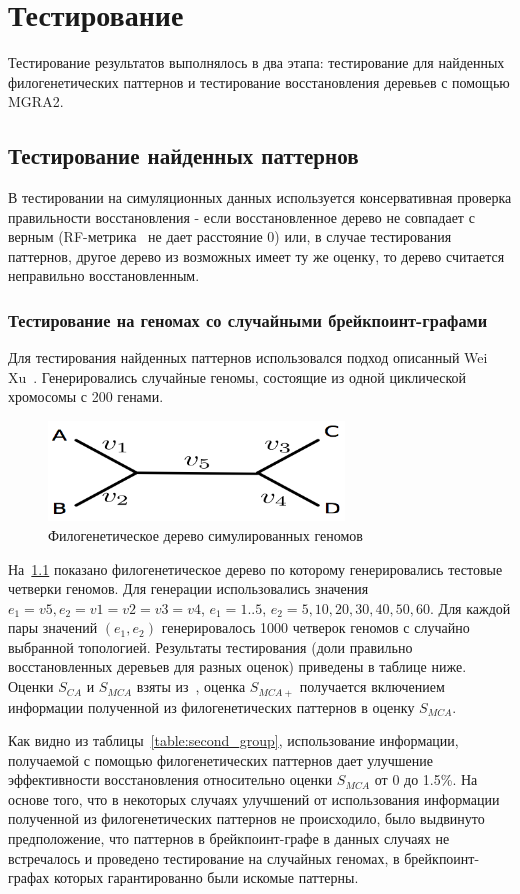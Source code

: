 \chapter{Тестирование}
Тестирование результатов выполнялось в два этапа: тестирование для найденных филогенетических паттернов и тестирование
восстановления деревьев с помощью MGRA2.

\section{Тестирование найденных паттернов}
В тестировании на симуляционных данных используется консервативная проверка правильности восстановления -
если восстановленное дерево не совпадает с верным (RF-метрика~\cite{Robinson1981} не дает расстояние 0)
или, в случае тестирования паттернов, другое дерево из возможных имеет ту же оценку, то дерево считается неправильно восстановленным.

\subsection{Тестирование на геномах со случайными брейкпоинт-графами}
Для тестирования найденных паттернов использовался подход описанный Wei Xu~\cite{xu2010exploring}.
Генерировались случайные геномы, состоящие из одной циклической хромосомы с 200 генами.
\begin{figure}[H]
  \centering
  \includegraphics[max width=0.7\textwidth]{fig/3/wei_xu_tree.png}
  \caption{Филогенетическое дерево симулированных геномов~\cite{xu2010exploring}}
  \label{fig:testing_phyl_tree}
\end{figure}
\vspace{-1em}На~\ref{fig:testing_phyl_tree} показано филогенетическое дерево по которому генерировались тестовые четверки геномов.
Для генерации использовались значения $e_1 = v5, e_2 = v1 = v2 = v3 = v4$,
$e_1 = 1..5$, $e_2 = 5, 10, 20, 30, 40, 50, 60$.
Для каждой пары значений $(e_1, e_2)$ генерировалось 1000 четверок геномов с случайно выбранной топологией.
Результаты тестирования (доли правильно восстановленных деревьев для разных оценок)
приведены в таблице ниже. Оценки $S_{CA}$ и $S_{MCA}$ взяты из~\cite{xu2010exploring},
оценка $S_{MCA+}$ получается включением информации полученной из филогенетических паттернов в оценку $S_{MCA}$.

Как видно из таблицы~\ref{table:second_group}, использование информации,
получаемой с помощью филогенетических паттернов дает улучшение эффективности восстановления относительно оценки $S_{MCA}$ от 0 до 1.5\%.
На основе того, что в некоторых случаях улучшений от использования информации полученной из филогенетических паттернов не происходило,
было выдвинуто предположение, что паттернов в брейкпоинт-графе в данных случаях не встречалось и
проведено тестирование на случайных геномах, в брейкпоинт-графах которых гарантированно были искомые паттерны.

